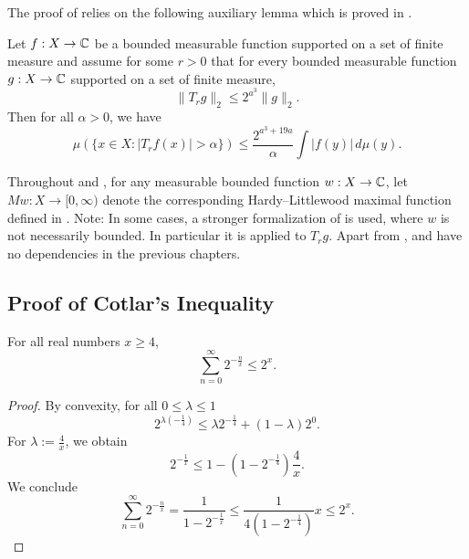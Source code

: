 The proof of  relies on the following auxiliary lemma which is proved in .
\begin{lemma}
    \label{calderon-zygmund-weak-1-1}
    \leanok
    Let $f:X\to\mathbb{C}$ be a bounded measurable function supported on a set of finite measure and assume for some $r>0$ that for every bounded measurable function $g:X\to\mathbb{C}$ supported on a set of finite measure,
    \begin{equation}
        \label{eq-strong-2-2-assumption}
        \|T_rg\|_{2}\le 2^{a^3} \|g\|_2.
    \end{equation}
    Then for all $\alpha>0$, we have
    \begin{equation}
        \label{eq-weak-1-1}
        \mu\left(\{x\in X: |T_r f(x)|>\alpha\}\right)\le \frac{2^{a^3 + 19a}}{\alpha} \int |f(y)|\, d\mu(y).
    \end{equation}
\end{lemma}
Throughout  and , for any measurable bounded function $w: X \to \mathbb{C}$, let $Mw: X \to [0, \infty)$ denote the corresponding Hardy--Littlewood maximal function defined in .
Note: In some cases, a stronger formalization of  is used, where $w$ is not necessarily bounded. In particular it is applied to $T_rg$.
Apart from ,  and  have no dependencies in the previous chapters.



\subsection{Proof of Cotlar's Inequality}
\label{subsec-cotlar}

\begin{lemma}
    \label{geometric-series-estimate}
    \leanok
    For all real numbers $x\ge 4$,
    \begin{equation*}
        \sum_{n=0}^\infty 2^{-\frac{n}{x}} \le 2^x.
    \end{equation*}
\end{lemma}
\begin{proof}
    \leanok
    By convexity, for all $0\le\lambda\le1$
    \begin{equation*}
        2^{\lambda(-\frac{1}{4})} \le \lambda 2^{-\frac{1}{4}} + (1-\lambda)2^0.
    \end{equation*}
    For $\lambda:=\frac{4}{x}$, we obtain
    \begin{equation*}
        2^{-\frac 1 x} \le 1 - (1-2^{-\frac 1 4}) \frac{4}{x}.
    \end{equation*}
    We conclude
    \begin{equation*}
        \sum_{n=0}^\infty 2^{-\frac{n}{x}} = \frac{1}{1-2^{-\frac 1 x}} \le \frac{1}{4(1-2^{-\frac 1 4})} x \le 2^x.
    \end{equation*}
\end{proof}


